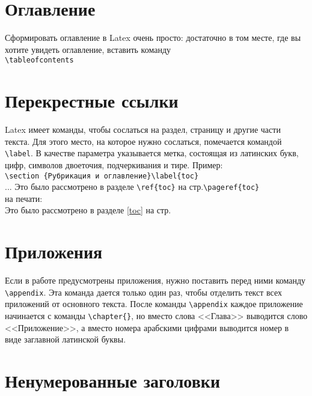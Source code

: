 \section{Оглавление}
Сформировать оглавление в Latex очень просто: достаточно в том месте, где вы хотите увидеть оглавление, вставить команду \\
\verb|\tableofcontents|

\section{Перекрестные ссылки}

Latex имеет команды, чтобы сослаться на раздел, страницу и другие части текста. Для этого место, на которое нужно сослаться, помечается командой \verb|\label|. В качестве параметра указывается метка, состоящая из латинских букв, цифр, символов двоеточия, подчеркивания и тире. Пример:\\
\verb|\section {Рубрикация и оглавление}\label{toc}|\\
...
Это было рассмотрено в разделе \verb|\ref{toc}| на стр.\verb|\pageref{toc}|\\
на печати:\\
Это было рассмотрено в разделе \ref{toc} на стр. \pageref{toc}\\

\section{Приложения}

Если в работе предусмотрены приложения, нужно поставить перед ними команду \verb|\appendix|. Эта команда дается только один раз, чтобы отделить текст всех приложений от основного текста. После команды \verb|\appendix| каждое приложение начинается с команды \verb|\chapter{}|, но вместо слова <<Глава>> выводится слово <<Приложение>>, а вместо номера арабскими цифрами выводится номер в виде заглавной латинской буквы.

\section{Ненумерованные заголовки}

